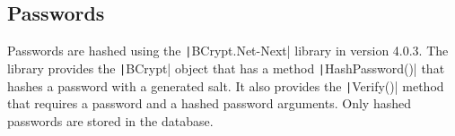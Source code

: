 \subsection{Passwords}

Passwords are hashed using the \texttt|BCrypt.Net-Next| library in version 4.0.3.
The library provides the \texttt|BCrypt| object that has a method \texttt|HashPassword()| that hashes a password with a generated salt.
It also provides the \texttt|Verify()| method that requires a password and a hashed password arguments. 
Only hashed passwords are stored in the database.
